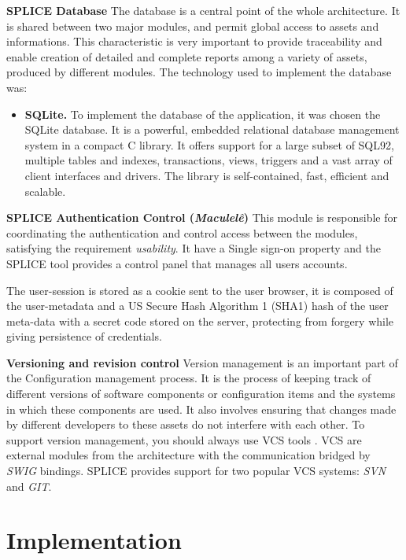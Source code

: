 \textbf{\ac{SPLICE} Database}
The database is a central point of the whole architecture. It is shared between two major modules, and permit global access to assets and informations. This characteristic is very important to provide traceability and enable creation of detailed and complete reports among a variety of assets, produced by different modules. The technology used to implement the database was:
\begin{itemize}
\item  \textbf{ SQLite.} To implement the database of the application, it was chosen the SQLite database. It is a powerful, embedded relational database management system in a compact C library. It offers support for a large subset of SQL92, multiple tables and indexes, transactions, views, triggers and a vast array of client interfaces and drivers. The library is self-contained, fast, efficient and scalable. 

\end{itemize}

\textbf{\ac{SPLICE} Authentication Control (\textit{Maculelê}) }
This module is responsible for coordinating the authentication and control access between the modules, satisfying the requirement \textit{usability}. It have a Single sign-on property and the \ac{SPLICE} tool provides a control panel that manages all users accounts. 

The user-session is stored as a cookie sent to the user browser, it is composed of the user-metadata and a US Secure Hash Algorithm 1 (SHA1) hash of the user meta-data with a secret code stored on the server, protecting from forgery while giving persistence of credentials. 

\textbf{Versioning and revision control }
Version management is an important part of the Configuration management process. It is the process of keeping track of different versions of software components or configuration items and the systems in which these components are used. It also involves ensuring that changes made by different developers to these assets do not interfere with each other. To support version management, you should always use \acf{VCS} tools \citep{Sommerville2011}. \ac{VCS} are external modules from the architecture with the communication bridged by \textit{SWIG} bindings.  \ac{SPLICE} provides support for two popular \ac{VCS} systems: \textit{SVN} and \textit{GIT}. 





\section{Implementation}
\label{sc:implementation}



